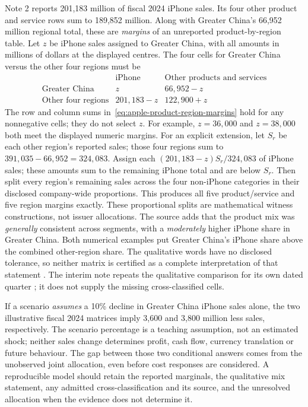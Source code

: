 Note 2 reports 201,183 million of fiscal 2024 iPhone sales. Its four other
product and service rows sum to 189,852 million. Along with Greater China's
66,952 million regional total, these are \emph{margins} of an unreported
product-by-region table. Let $z$ be iPhone sales assigned to Greater China,
with all amounts in millions of dollars at the displayed centres. The four
cells for Greater China versus the other four regions must be
\begin{equation}
\begin{array}{c|cc}
 &\text{iPhone}&\text{Other products and services}\\\hline
\text{Greater China}&z&66{,}952-z\\
\text{Other four regions}&201{,}183-z&122{,}900+z
\end{array}
\label{eq:apple-product-region-margins}
\end{equation}
The row and column sums in~\eqref{eq:apple-product-region-margins} hold for
any nonnegative cells; they do not select
$z$. For example, $z=36{,}000$ and $z=38{,}000$ both meet the displayed
numeric margins. For an explicit extension, let $S_r$ be each other region's
reported sales; those four regions sum to $391{,}035-66{,}952=324{,}083$.
Assign each $(201{,}183-z)S_r/324{,}083$ of iPhone sales;
these amounts sum to the remaining iPhone total and are below $S_r$.
Then split every region's remaining sales across the four non-iPhone categories
in their disclosed company-wide proportions. This produces all five
product/service and five region margins exactly. These proportional splits
are mathematical witness constructions, not issuer allocations. The source adds that the product mix
was \emph{generally} consistent across segments, with a \emph{moderately}
higher iPhone share in Greater China. Both numerical examples put Greater
China's iPhone share above the combined other-region share. The qualitative
words have no disclosed tolerance, so neither matrix is certified as a
complete interpretation of that statement
\citep[Note 2, printed pp.~35--36]{apple2024}. The interim note repeats the
qualitative comparison for its own dated quarter
\citep[Note 2, printed p.~6]{apple2025q1}; it does not supply the missing
cross-classified cells.

If a scenario \emph{assumes} a 10\% decline in Greater China iPhone sales
alone, the two illustrative fiscal 2024 matrices imply 3,600 and 3,800
million less sales, respectively. The scenario percentage is a teaching
assumption, not an estimated shock; neither sales change determines profit,
cash flow, currency translation or future behaviour. The gap between those
two conditional answers comes from the unobserved joint allocation, even
before cost responses are considered. A reproducible model should retain
the reported marginals, the qualitative mix statement, any admitted
cross-classification and its source, and the unresolved allocation when
the evidence does not determine it.


